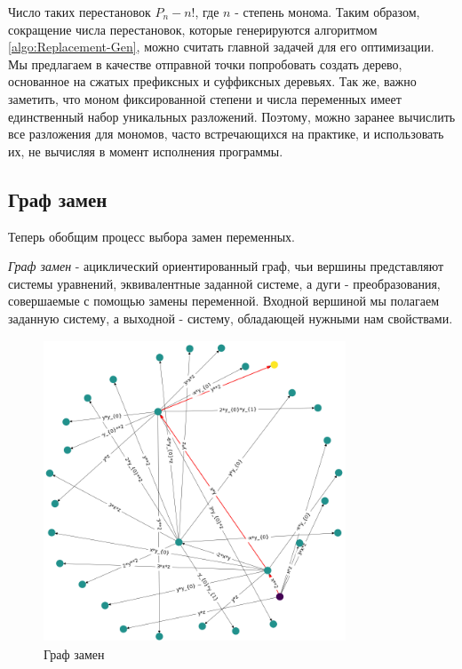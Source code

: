 Число таких перестановок $P_n - n!$, где $n$ - степень монома. Таким образом, сокращение числа перестановок, которые генерируются алгоритмом \ref{algo:Replacement-Gen}, можно считать главной задачей для его оптимизации. Мы предлагаем в качестве отправной точки попробовать создать дерево, основанное на сжатых префиксных и суффиксных деревьях. Так же, важно заметить, что моном фиксированной степени и числа переменных имеет единственный набор уникальных разложений. Поэтому, можно заранее вычислить все разложения для мономов, часто встречающихся на практике, и использовать их, не вычисляя в момент исполнения программы.

\subsection{Граф замен} \label{sec:replacement-graph}

Теперь обобщим процесс выбора замен переменных.

\begin{definition}
    \textit{Граф замен} - ациклический ориентированный граф, чьи вершины представляют системы уравнений, эквивалентные заданной системе, а дуги - преобразования, совершаемые с помощью замены переменной. Входной вершиной мы полагаем заданную систему, а выходной - систему, обладающей нужными нам свойствами.
\end{definition}


\begin{figure}
\includegraphics[width=9cm,height=9cm]{chapters/images/replacement_graph.png} 
\caption{Граф замен}
\label{fig:replacement-graph}
\end{figure}

